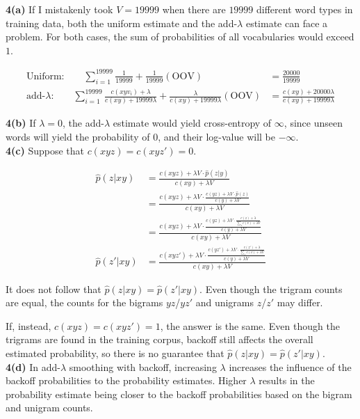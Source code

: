 \documentclass{article}
\begin{document}
\pagebreak

\textbf{4(a)} If I mistakenly took $V = 19999$ when there are $19999$ different word types in training data, both the uniform estimate and the add-$\lambda$ estimate can face a problem. For both cases, the sum of probabilities of all vocabularies would exceed $1$.

\begin{align*}
	\text{Uniform:} \qquad \sum_{i=1}^{19999} \frac{1}{19999} + \frac{1}{19999} (\text{OOV}) &= \frac{20000}{19999} \\
	\text{add-$\lambda$:} \qquad \sum_{i=1}^{19999} \frac{c(xyv_i) + \lambda}{c(xy) + 19999\lambda} + \frac{\lambda}{c(xy) + 19999\lambda} (\text{OOV}) &= \frac{c(xy) + 20000\lambda}{c(xy) + 19999\lambda}
\end{align*}

\textbf{4(b)} If $\lambda=0$, the add-$\lambda$ estimate would yield cross-entropy of $\infty$, since unseen words will yield the probability of $0$, and their log-value will be $-\infty$. \\

\textbf{4(c)} Suppose that $c(xyz) = c(xyz') = 0$.

\begin{align*}
	\hat{p}(z | xy) &= \frac{c(xyz) + \lambda V \cdot \hat{p}(z | y)}{c(xy) + \lambda V} \\
	&= \frac{c(xyz) + \lambda V \cdot \frac{c(yz) + \lambda V \cdot \hat{p}(z)}{c(y) + \lambda V}}{c(xy) + \lambda V} \\
	&= \frac{c(xyz) + \lambda V \cdot \frac{c(yz) + \lambda V \cdot \frac{c(z) + \lambda}{\sum_v c(v) + \lambda V}}{c(y) + \lambda V}}{c(xy) + \lambda V} \\
	\hat{p}(z' | xy) &= \frac{c(xyz') + \lambda V \cdot \frac{c(yz') + \lambda V \cdot \frac{c(z') + \lambda}{\sum_v c(v) + \lambda V}}{c(y) + \lambda V}}{c(xy) + \lambda V}
\end{align*}

It does not follow that $\hat{p}(z | xy) = \hat{p}(z' | xy)$. Even though the trigram counts are equal, the counts for the bigrams $yz$/$yz'$ and unigrams $z$/$z'$ may differ.

If, instead, $c(xyz) = c(xyz') = 1$, the answer is the same. Even though the trigrams are found in the training corpus, backoff still affects the overall estimated probability, so there is no guarantee that $\hat{p}(z | xy) = \hat{p}(z' | xy)$. \\

\textbf{4(d)} In add-$\lambda$ smoothing with backoff, increasing $\lambda$ increases the influence of the backoff probabilities to the probability estimates. Higher $\lambda$ results in the probability estimate being closer to the backoff probabilities based on the bigram and unigram counts.
\end{document}
